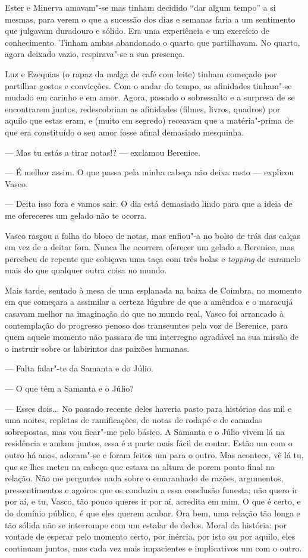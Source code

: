 Ester e Minerva amavam"-se mas tinham decidido ``dar algum tempo'' a si
mesmas, para verem o que a sucessão dos dias e semanas faria a um
sentimento que julgavam duradouro e sólido. Era uma experiência e um
exercício de conhecimento. Tinham ambas abandonado o quarto que
partilhavam. No quarto, agora deixado vazio, respirava"-se a sua
presença.

Luz e Ezequias (o rapaz da malga de café com leite) tinham começado
por partilhar gostos e convicções. Com o andar do tempo, as afinidades
tinham"-se mudado em carinho e em amor. Agora, passado o sobressalto e a
surpresa de se encontrarem juntos, redescobriam as afinidades (filmes,
livros, quadros) por aquilo que estas eram, e (muito em segredo) receavam que a matéria"-prima de que era constituído o seu amor fosse
afinal demasiado mesquinha.

--- Mas tu estás a tirar notas!? --- exclamou Berenice.

--- É melhor assim. O que passa pela minha cabeça não deixa rasto ---
  explicou Vasco.

--- Deita isso fora e vamos sair. O dia está demasiado lindo para que a
  ideia de me ofereceres um gelado não te ocorra.

  Vasco rasgou a folha
  do bloco de notas, mas enfiou"-a no bolso de trás das calças em vez de
  a deitar fora. Nunca lhe ocorrera oferecer um gelado a Berenice, mas
  percebeu de repente que cobiçava uma taça com três bolas e
  \emph{topping }de caramelo mais do que qualquer outra coisa no mundo.

Mais tarde, sentado à mesa de uma esplanada na baixa de Coimbra, no
momento em que começara a assimilar a certeza lúgubre de que a amêndoa e
o maracujá casavam melhor na imaginação do que no mundo real, Vasco foi
arrancado à contemplação do progresso penoso dos transeuntes pela voz
de Berenice, para quem aquele momento não passara de um interregno
agradável na sua missão de o instruir sobre os labirintos das paixões
humanas.

--- Falta falar"-te da Samanta e do Júlio.

--- O que têm a Samanta e o Júlio?

--- Esses dois... No passado recente deles haveria pasto para histórias
  das mil e uma noites, repletas de ramificações, de notas de rodapé e
  de camadas sobrepostas, mas vou ficar"-me pelo básico. A Samanta e o Júlio vivem lá na residência e andam
juntos, essa é a parte mais fácil de contar. Estão um com o outro há
anos, adoram"-se e foram feitos um para o outro. Mas acontece, vê lá tu,
que se lhes meteu na cabeça que estava na altura de porem ponto final na
relação. Não me perguntes nada sobre o emaranhado de razões, argumentos,
pressentimentos e agoiros que os conduziu a essa conclusão funesta; não
quero ir por aí, e tu, Vasco, tão pouco queres ir por aí, acredita em
mim. O que é certo, e do domínio público, é que eles querem acabar. Ora
bem, uma relação tão longa e tão sólida não se interrompe com um estalar
de dedos. Moral
da história: por vontade de esperar pelo momento certo, por inércia, por
isto ou por aquilo, eles continuam juntos, mas cada vez mais impacientes
e implicativos um com o outro.

